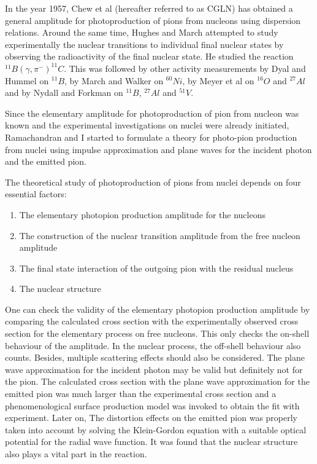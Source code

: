 In the year 1957, Chew et al (hereafter referred to as CGLN) \cite{chap3-key13} has obtained a general amplitude for photoproduction of pions from nucleons using dispersion relations. Around the same time, Hughes and March \cite{chap3-key14} attempted to study experimentally the nuclear transitions to individual final nuclear states by observing the radioactivity of the final nuclear state. He studied the reaction ${}^{11} B(\gamma, \pi^-)^{11} C$. This was followed by other activity measurements by Dyal and Hummel \cite{chap3-key15} on ${}^{11} B$, by March and Walker \cite{chap3-key16} on ${}^{60} N i$, by Meyer et al \cite{chap3-key17} on ${}^{16} O$ and ${}^{27} Al$ and by Nydall and Forkman \cite{chap3-key18} on ${}^{11} B$, ${}^{27} Al$ and ${}^{51} V$.

Since the elementary amplitude for photoproduction of pion from nucleon was known and the experimental investigations on nuclei were already initiated, Ramachandran and I \cite{chap3-key4, chap3-key5} started to formulate a theory for photo-pion production from nuclei using impulse approximation and plane waves for the incident photon and the emitted pion.

The theoretical study of photoproduction of pions from nuclei depends on four essential factors:
\begin{enumerate}
\item The elementary photopion production amplitude for the nucleons
\item The construction of the nuclear transition amplitude from the free nucleon amplitude
\item The final state interaction of the outgoing pion with the residual nucleus
\item The nuclear structure
\end{enumerate}

One can check the validity of the elementary photopion production amplitude by comparing the calculated cross section with the experimentally observed cross section for the elementary process on free nucleons. This only checks the on-shell behaviour of the amplitude. In the nuclear process, the off-shell behaviour also counts. Besides, multiple scattering effects should also be considered. The plane wave approximation for the incident photon may be valid but definitely not for the pion. The calculated cross section with the plane wave approximation for the emitted pion was much larger than the experimental cross section and a phenomenological surface production model \cite{chap3-key19} was invoked to obtain the fit with experiment. Later on, The distortion effects on the emitted pion \cite{chap3-key20,chap3-key21} was properly taken into account by solving the Klein-Gordon equation with a suitable optical potential for the radial wave function. It was found that the nuclear structure also plays a vital part in the reaction.

